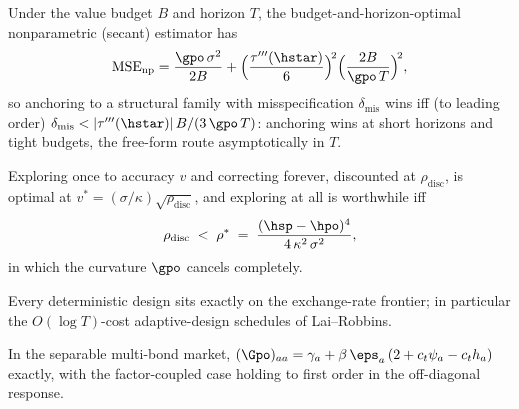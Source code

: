 \documentclass[11pt]{article}
\begin{document}
\begin{theorem}
Under the value budget $B$ and horizon $T$, the budget-and-horizon-optimal
nonparametric (secant) estimator has
\[
\mathrm{MSE}_{\mathrm{np}} = \frac{\gpo\,\sigma^2}{2B}
+ \Big(\frac{\tau'''(\hstar)}{6}\Big)^{\!2}
\Big(\frac{2B}{\gpo\,T}\Big)^{\!2},
\]
so anchoring to a structural family with misspecification
$\delta_{\mathrm{mis}}$ wins iff (to leading order)
$\delta_{\mathrm{mis}} < |\tau'''(\hstar)|\,B/(3\,\gpo\,T)$: anchoring wins
at short horizons and tight budgets, the free-form route asymptotically in
$T$.
\end{theorem}

\begin{theorem}
Exploring once to accuracy $v$ and correcting forever, discounted at
$\rho_{\mathrm{disc}}$, is optimal at
$v^{*} = (\sigma/\kappa)\sqrt{\rho_{\mathrm{disc}}}$, and exploring at all
is worthwhile iff
\[
\rho_{\mathrm{disc}} \;<\; \rho^{*} \;=\;
\frac{(\hsp - \hpo)^4}{4\,\kappa^2\,\sigma^2},
\]
in which the curvature $\gpo$ cancels completely.
\end{theorem}

\begin{proposition}
Every deterministic design sits exactly on the exchange-rate frontier; in
particular the $O(\log T)$-cost adaptive-design schedules of Lai--Robbins.
\end{proposition}

\begin{proposition}
In the separable multi-bond market,
$(\Gpo)_{aa} = \gamma_a + \beta\,\eps_a\,(2 + c_t\psi_a - c_t h_a)$
exactly, with the factor-coupled case holding to first order in the
off-diagonal response.
\end{proposition}

\end{document}

